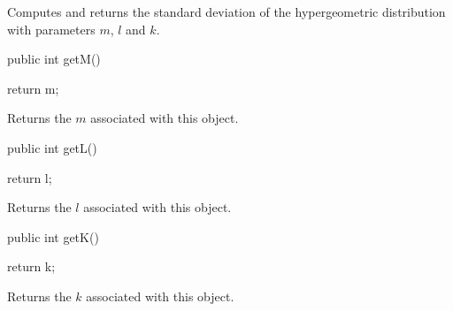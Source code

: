 \begin{tabb}  Computes and returns the standard deviation of the hypergeometric distribution
   with parameters $m$, $l$ and $k$.
\end{tabb}
\begin{htmlonly}
\end{htmlonly}
\begin{code}

   public int getM()\begin{hide} {
      return m;
   }\end{hide}
\end{code}
\begin{tabb}
   Returns the $m$ associated with this object.
\end{tabb}
\begin{code}

   public int getL()\begin{hide} {
      return l;
   }\end{hide}
\end{code}
\begin{tabb}
   Returns the $l$ associated with this object.
\end{tabb}
\begin{code}

   public int getK()\begin{hide} {
      return k;
   }\end{hide}
\end{code}
\begin{tabb}
   Returns the $k$ associated with this object.
\end{tabb}
